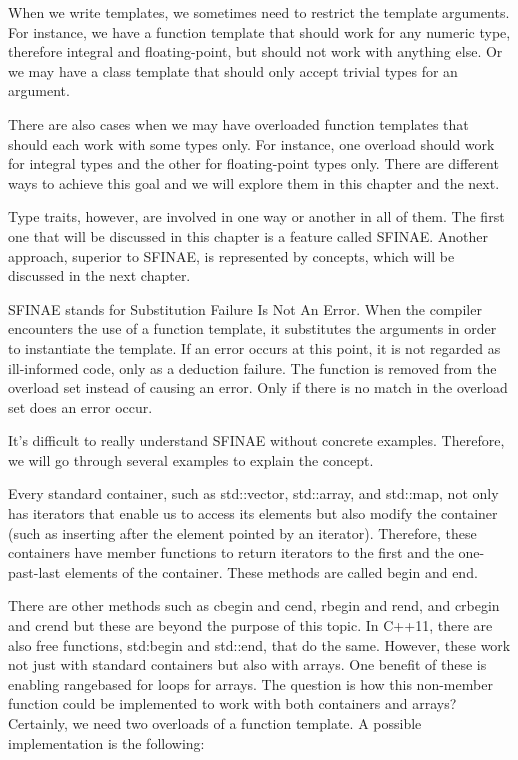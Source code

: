 When we write templates, we sometimes need to restrict the template arguments. For instance, we have a function template that should work for any numeric type, therefore integral and floating-point, but should not work with anything else. Or we may have a class template that should only accept trivial types for an argument.

There are also cases when we may have overloaded function templates that should each work with some types only. For instance, one overload should work for integral types and the other for floating-point types only. There are different ways to achieve this goal and we will explore them in this chapter and the next.

Type traits, however, are involved in one way or another in all of them. The first one that will be discussed in this chapter is a feature called SFINAE. Another approach, superior to SFINAE, is represented by concepts, which will be discussed in the next chapter.

SFINAE stands for Substitution Failure Is Not An Error. When the compiler encounters the use of a function template, it substitutes the arguments in order to instantiate the template. If an error occurs at this point, it is not regarded as ill-informed code, only as a deduction failure. The function is removed from the overload set instead of causing an error. Only if there is no match in the overload set does an error occur.

It’s difficult to really understand SFINAE without concrete examples. Therefore, we will go through several examples to explain the concept.

Every standard container, such as std::vector, std::array, and std::map, not only has iterators that enable us to access its elements but also modify the container (such as inserting after the element pointed by an iterator). Therefore, these containers have member functions to return iterators to the first and the one-past-last elements of the container. These methods are called begin and end.

There are other methods such as cbegin and cend, rbegin and rend, and crbegin and crend but these are beyond the purpose of this topic. In C++11, there are also free functions, std:begin and std::end, that do the same. However, these work not just with standard containers but also with arrays. One benefit of these is enabling rangebased for loops for arrays. The question is how this non-member function could be implemented to work with both containers and arrays? Certainly, we need two overloads of a function template. A possible implementation is the following:

